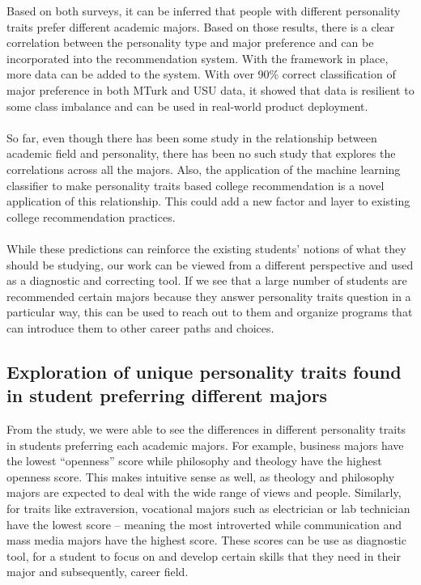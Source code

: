 \documentclass[conference]{IEEEtran}
\begin{document}
Based on both surveys, it can be inferred that people with different personality
traits prefer different academic majors. Based on those results, there is a clear
correlation between the personality type and major preference and can be incorporated
into the recommendation system. With the framework in place, more data can be added
to the system. With over 90\% correct classification of
major preference in both MTurk and USU data, it showed that data is resilient to some
class imbalance and can be used in real-world product deployment. \\ \\
So far, even though there has been some study in the relationship between academic
field and personality, there has been no such study that explores the correlations across
all the majors. Also, the application of the machine learning classifier to make
personality traits based college recommendation is a novel application of this
relationship. This could add a new factor and layer to existing college recommendation
practices. \\ \\
While these predictions can reinforce the existing students’ notions of what they should
be studying, our work can be viewed from a different perspective and used as a
diagnostic and correcting tool. If we see that a large number of students are
recommended certain majors because they answer personality traits question in a
particular way, this can be used to reach out to them and organize programs that can
introduce them to other career paths and choices.

\subsection{Exploration of unique personality traits found in student preferring different
majors} \label{subsubsec5}

From the study, we were able to see the differences in different personality traits
in students preferring each academic majors. For example, business majors have the
lowest “openness” score while philosophy and theology have the highest openness
score. This makes intuitive sense as well, as theology and philosophy majors are
expected to deal with the wide range of views and people. Similarly, for traits like
extraversion, vocational majors such as electrician or lab technician have the lowest
score – meaning the most introverted while communication and mass media majors
have the highest score. These scores can be use as diagnostic tool, for a student to focus
on and develop certain skills that they need in their major and subsequently, career
field.
\end{document}
